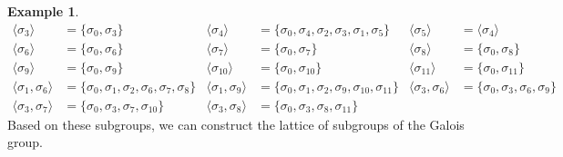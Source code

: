 \documentclass[leqno]{article}
\theoremstyle{definition}
\theoremstyle{remark}
\theoremstyle{definition}
\newtheorem{example}{Example}
\begin{document}
\begin{example}
\begin{align*}
                                \langle\sigma_3\rangle&=\{\sigma_0,\sigma_3\} & \langle\sigma_4\rangle&=\{\sigma_0,\sigma_4,\sigma_2,\sigma_3,\sigma_1,\sigma_5\} & \langle\sigma_5\rangle&=\langle\sigma_4\rangle \\
                                \langle\sigma_6\rangle&=\{\sigma_0,\sigma_6\} & \langle\sigma_7\rangle&=\{\sigma_0,\sigma_7\} & \langle\sigma_8\rangle&=\{\sigma_0,\sigma_8\} \\
                                \langle\sigma_9\rangle&=\{\sigma_0,\sigma_9\} & \langle\sigma_{10}\rangle&=\{\sigma_0,\sigma_{10}\} & \langle\sigma_{11}\rangle&=\{\sigma_0,\sigma_{11}\} \\
                                \langle\sigma_1,\sigma_6\rangle&=\{\sigma_0,\sigma_1,\sigma_2,\sigma_6,\sigma_7,\sigma_8\} & \langle\sigma_1,\sigma_9\rangle&=\{\sigma_0,\sigma_1,\sigma_2,\sigma_9,\sigma_{10},\sigma_{11}\} & \langle\sigma_3,\sigma_6\rangle&=\{\sigma_0,\sigma_3,\sigma_6,\sigma_9\} \\ \langle\sigma_3,\sigma_7\rangle&=\{\sigma_0,\sigma_3,\sigma_7,\sigma_{10}\} & \langle\sigma_3,\sigma_8\rangle&=\{\sigma_0,\sigma_3,\sigma_8,\sigma_{11}\} 
                            \end{align*}
                        Based on these subgroups, we can construct the lattice of subgroups of the Galois group.\newpage
                            \begin{center}
\end{center}
\end{example}
\end{document}
